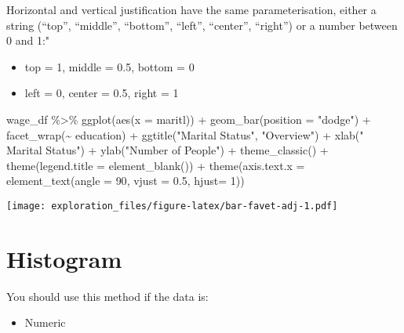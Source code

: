 \documentclass[
]{book}
\newenvironment{Shaded}{\begin{snugshade}}{\end{snugshade}}
\newcommand{\AttributeTok}[1]{\textcolor[rgb]{0.77,0.63,0.00}{#1}}
\newcommand{\DecValTok}[1]{\textcolor[rgb]{0.00,0.00,0.81}{#1}}
\newcommand{\FloatTok}[1]{\textcolor[rgb]{0.00,0.00,0.81}{#1}}
\newcommand{\FunctionTok}[1]{\textcolor[rgb]{0.00,0.00,0.00}{#1}}
\newcommand{\NormalTok}[1]{#1}
\newcommand{\SpecialCharTok}[1]{\textcolor[rgb]{0.00,0.00,0.00}{#1}}
\newcommand{\StringTok}[1]{\textcolor[rgb]{0.31,0.60,0.02}{#1}}
\providecommand{\tightlist}{%
  \setlength{\itemsep}{0pt}\setlength{\parskip}{0pt}}
\begin{document}
Horizontal and vertical justification have the same parameterisation, either a string (``top'', ``middle'', ``bottom'', ``left'', ``center'', ``right'') or a number between 0 and 1:"

\begin{itemize}
\tightlist
\item
  top = 1, middle = 0.5, bottom = 0
\item
  left = 0, center = 0.5, right = 1
\end{itemize}

\begin{Shaded}
\begin{Highlighting}[]
\NormalTok{wage\_df }\SpecialCharTok{\%\textgreater{}\%} 
  \FunctionTok{ggplot}\NormalTok{(}\FunctionTok{aes}\NormalTok{(}\AttributeTok{x =}\NormalTok{ maritl)) }\SpecialCharTok{+}
  \FunctionTok{geom\_bar}\NormalTok{(}\AttributeTok{position =} \StringTok{"dodge"}\NormalTok{) }\SpecialCharTok{+}
  \FunctionTok{facet\_wrap}\NormalTok{(}\SpecialCharTok{\textasciitilde{}}\NormalTok{ education) }\SpecialCharTok{+} 
  \FunctionTok{ggtitle}\NormalTok{(}\StringTok{"Marital Status"}\NormalTok{, }\StringTok{"Overview"}\NormalTok{) }\SpecialCharTok{+}
  \FunctionTok{xlab}\NormalTok{(}\StringTok{" Marital Status"}\NormalTok{) }\SpecialCharTok{+}
  \FunctionTok{ylab}\NormalTok{(}\StringTok{"Number of People"}\NormalTok{) }\SpecialCharTok{+}
  \FunctionTok{theme\_classic}\NormalTok{() }\SpecialCharTok{+}
  \FunctionTok{theme}\NormalTok{(}\AttributeTok{legend.title =} \FunctionTok{element\_blank}\NormalTok{()) }\SpecialCharTok{+}
  \FunctionTok{theme}\NormalTok{(}\AttributeTok{axis.text.x =} \FunctionTok{element\_text}\NormalTok{(}\AttributeTok{angle =} \DecValTok{90}\NormalTok{, }
                                   \AttributeTok{vjust =} \FloatTok{0.5}\NormalTok{, }
                                   \AttributeTok{hjust=}  \DecValTok{1}\NormalTok{))}
\end{Highlighting}
\end{Shaded}

\texttt{[image: exploration\_files/figure-latex/bar-favet-adj-1.pdf]}

\hypertarget{histogram}{%
\chapter{Histogram}\label{histogram}}

You should use this method if the data is:

\begin{itemize}
\tightlist
\item
  Numeric
\end{itemize}
\end{document}
